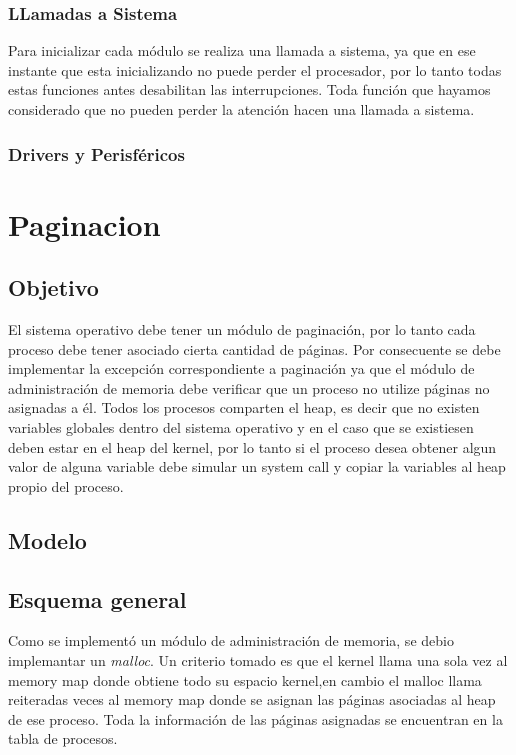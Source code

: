 \documentclass[10pt,a4paper]{article}
\begin{document}
	\subsubsection{LLamadas a Sistema}
		Para inicializar cada m\'odulo se realiza una llamada a sistema, ya que en ese instante que esta inicializando no puede perder el procesador, por lo tanto todas estas funciones antes desabilitan las interrupciones. Toda funci\'on que hayamos considerado que no pueden perder la atenci\'on hacen una llamada a sistema.
	\subsubsection{Drivers y Perisf\'ericos}

\section{Paginacion}
	\subsection{Objetivo}
		El sistema operativo debe tener un m\'odulo de paginaci\'on, por lo tanto cada proceso debe tener asociado cierta cantidad de p\'aginas. Por consecuente se debe implementar la excepci\'on correspondiente a paginaci\'on ya que el m\'odulo de administraci\'on de memoria debe verificar que un proceso no utilize p\'aginas no asignadas a \'el. Todos los procesos comparten el heap, es decir que no existen variables globales dentro del sistema operativo y en el caso que se existiesen deben estar en el heap del kernel, por lo tanto si el proceso desea obtener algun valor de alguna variable debe simular un system call y copiar la variables al heap propio del proceso.
	\subsection{Modelo}
	\subsection{Esquema general}
		Como se implement\'o un m\'odulo de administraci\'on de memoria, se debio implemantar un \textit{malloc}. Un criterio tomado es que el kernel llama una sola vez al memory map donde obtiene todo su espacio kernel,en cambio el malloc llama reiteradas veces al memory map donde se asignan las p\'aginas asociadas al heap de ese proceso. Toda la informaci\'on de las p\'aginas asignadas se encuentran en la tabla de procesos.
\end{document}
